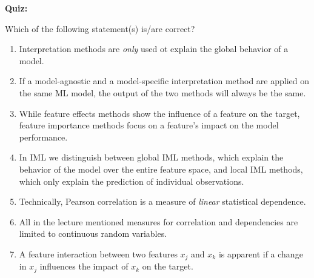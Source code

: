 \textbf{Quiz:}\\ \noindent
\vspace{0.1cm}

Which of the following statement(s) is/are correct?  
        	\begin{enumerate}
        	\item Interpretation methods are \textit{only} used ot explain the global behavior of a model. 
        	\item If a model-agnostic and a model-specific interpretation method are applied on the same ML model, the output of the two methods will always be the same.
        	\item While feature effects methods show the influence of a feature on the target, feature importance methods focus on a feature's impact on the model performance.
        	\item In IML we distinguish between global IML methods, which explain the behavior of the model over the entire feature space, and local IML methods, which only explain the prediction of individual observations. 
        	\item Technically, Pearson correlation is a measure of \textit{linear} statistical dependence. 
        	\item All in the lecture mentioned measures for correlation and dependencies are limited to continuous random variables.
        	\item A feature interaction between two features $x_j$ and $x_k$ is apparent if a change in $x_j$ influences the impact of $x_k$ on the target.
        \end{enumerate}